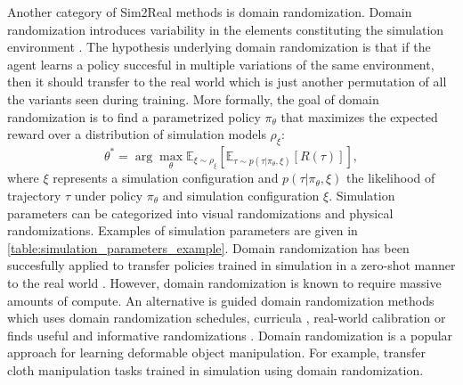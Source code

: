 \documentclass[\home/main.tex]{subfiles}
\begin{document}
Another category of Sim2Real methods is domain randomization. Domain randomization introduces variability in the elements constituting the simulation environment \autocite{tobin2017domain}. The hypothesis underlying domain randomization is that if the agent learns a policy succesful in multiple variations of the same environment, then it should transfer to the real world which is just another permutation of all the variants seen during training. More formally, the goal of domain randomization is to find a parametrized policy $\pi_{\theta}$ that maximizes the expected reward over a distribution of simulation models $\rho_{\xi}$:
\begin{equation}
	\theta^{*}=\arg \max _{\theta} \mathbb{E}_{\xi \sim \rho_{\xi}}\left[\mathbb{E}_{\tau \sim p(\tau | \pi_{\theta}, \xi)}[R(\tau)]\right],
\end{equation}
where $\xi$ represents a simulation configuration and $p(\tau | \pi_{\theta}, \xi)$ the likelihood of trajectory $\tau$ under policy $\pi_{\theta}$ and simulation configuration $\xi$. Simulation parameters can be categorized into visual randomizations and physical randomizations. Examples of simulation parameters are given in \cref{table:simulation_parameters_example}. 
Domain randomization has been succesfully applied to transfer policies trained in simulation in a zero-shot manner to the real world \autocite{tobin2017domain, Peng2018, openai2019solving}. However, domain randomization is known to require massive amounts of compute. An alternative is guided domain randomization methods which uses domain randomization schedules, curricula \autocite{raparthy2020generating}, real-world calibration \autocite{chebotar2019closing} or finds useful and informative randomizations \autocite{adr2019}. Domain randomization is a popular approach for learning deformable object manipulation. For example, \autocite{Matas2018, wu2020learning} transfer cloth manipulation tasks trained in simulation using domain randomization. 
\end{document}
